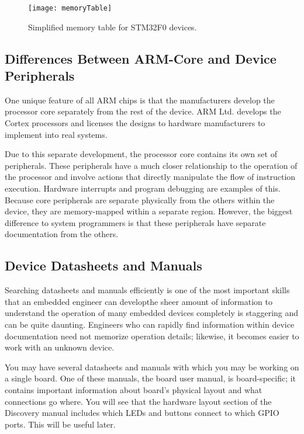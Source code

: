 \documentclass[openany,11pt,fleqn]{book} %
\begin{document}
\begin{figure}[]
    \centering\texttt{[image: memoryTable]}
    \caption{Simplified memory table for STM32F0 devices.}
    \label{memoryTable}
\end{figure}


\subsection{\color{orange}Differences Between ARM-Core and Device Peripherals}

One unique feature of all ARM chips is that the manufacturers develop the processor core separately from the rest of the device. ARM Ltd. develops the Cortex processors and licenses the designs to hardware manufacturers to implement into real systems. 

Due to this separate development, the processor core contains its own set of peripherals. These peripherals have a much closer relationship to the operation of the processor and involve actions that directly manipulate the flow of instruction execution. Hardware interrupts and program debugging are examples of this. Because core peripherals are separate physically from the others within the device, they are memory-mapped within a separate region. However, the biggest difference to system programmers is that these peripherals have separate documentation from the others.


\subsection{Device Datasheets and Manuals}

Searching datasheets and manuals efficiently is one of the most important skills that an embedded engineer can develop\textemdash the sheer amount of information to understand the operation of many embedded devices completely is staggering and can be quite daunting. 
Engineers who can rapidly find information within device documentation need not memorize operation details; likewise, it becomes easier to work with an unknown device. 

You may have several datasheets and manuals with which you may be working on a single board. One of these manuals, the board user manual, is board-specific; it contains important information about board's physical layout and what connections go where. You will see that the hardware layout section of the Discovery manual includes which LEDs and buttons connect to which GPIO ports. This will be useful later.
\end{document}
